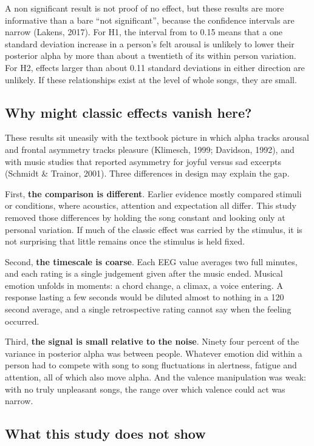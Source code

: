 \documentclass[11pt,a4paper]{article}
\newcommand{\m}{\textminus}
\begin{document}
A non significant result is not proof of no effect, but these results are more informative than a bare ``not significant'', because the confidence intervals are narrow (Lakens, 2017). For H1, the interval from \m0.05 to 0.15 means that a one standard deviation increase in a person's felt arousal is unlikely to lower their posterior alpha by more than about a twentieth of its within person variation. For H2, effects larger than about 0.11 standard deviations in either direction are unlikely. If these relationships exist at the level of whole songs, they are small.

\subsection{Why might classic effects vanish here?}

These results sit uneasily with the textbook picture in which alpha tracks arousal and frontal asymmetry tracks pleasure (Klimesch, 1999; Davidson, 1992), and with music studies that reported asymmetry for joyful versus sad excerpts (Schmidt \& Trainor, 2001). Three differences in design may explain the gap.

First, \textbf{the comparison is different}. Earlier evidence mostly compared stimuli or conditions, where acoustics, attention and expectation all differ. This study removed those differences by holding the song constant and looking only at personal variation. If much of the classic effect was carried by the stimulus, it is not surprising that little remains once the stimulus is held fixed.

Second, \textbf{the timescale is coarse}. Each EEG value averages two full minutes, and each rating is a single judgement given after the music ended. Musical emotion unfolds in moments: a chord change, a climax, a voice entering. A response lasting a few seconds would be diluted almost to nothing in a 120 second average, and a single retrospective rating cannot say when the feeling occurred.

Third, \textbf{the signal is small relative to the noise}. Ninety four percent of the variance in posterior alpha was between people. Whatever emotion did within a person had to compete with song to song fluctuations in alertness, fatigue and attention, all of which also move alpha. And the valence manipulation was weak: with no truly unpleasant songs, the range over which valence could act was narrow.

\subsection{What this study does not show}
\end{document}
